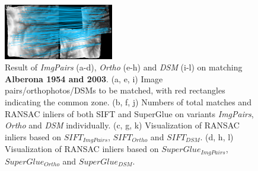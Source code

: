 \begin{figure}[htbp]
\begin{center}
{\begin{minipage}[t]{0.48\linewidth}
				\centering
				\includegraphics[width=4.8cm]{images/Chapitre3/Homol-SIFT2Step-Rough-2DRANSAC_MEC-Malt_Tapas_1954_MEC-Malt_Tapas_2003.png}
			\end{minipage}%
		}
		\caption{{\scriptsize Result of \textit{ImgPairs} (a-d), \textit{Ortho} (e-h) and \textit{DSM} (i-l) on matching \textbf{Alberona 1954 and 2003}. (a, e, i) Image pairs/orthophotos/DSMs to be matched, with red rectangles indicating the common zone. (b, f, j) Numbers of total matches and RANSAC inliers of both SIFT and SuperGlue on variants \textit{ImgPairs}, \textit{Ortho} and \textit{DSM} individually. (c, g, k) Visualization of RANSAC inliers based on $SIFT_{ImgPairs}$, $SIFT_{Ortho}$ and $SIFT_{DSM}$. (d, h, l) Visualization of RANSAC inliers based on $SuperGlue_{ImgPairs}$, $SuperGlue_{Ortho}$ and $SuperGlue_{DSM}$.}}
		\label{MatchVizAlberona1954DSM}
	\end{center}
\end{figure} 




